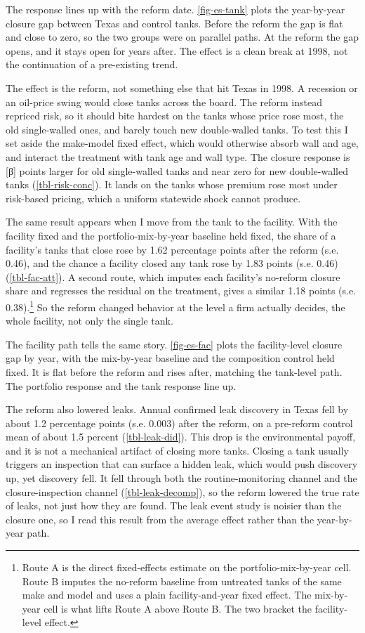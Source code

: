 \documentclass[
  12pt,
]{article}
\begin{document}
The response lines up with the reform date. \autoref{fig-es-tank} plots
the year-by-year closure gap between Texas and control tanks. Before the
reform the gap is flat and close to zero, so the two groups were on
parallel paths. At the reform the gap opens, and it stays open for years
after. The effect is a clean break at 1998, not the continuation of a
pre-existing trend.

The effect is the reform, not something else that hit Texas in 1998. A
recession or an oil-price swing would close tanks across the board. The
reform instead repriced risk, so it should bite hardest on the tanks
whose price rose most, the old single-walled ones, and barely touch new
double-walled tanks. To test this I set aside the make-model fixed
effect, which would otherwise absorb wall and age, and interact the
treatment with tank age and wall type. The closure response is {[}β{]}
points larger for old single-walled tanks and near zero for new
double-walled tanks (\autoref{tbl-risk-conc}). It lands on the tanks
whose premium rose most under risk-based pricing, which a uniform
statewide shock cannot produce.

The same result appears when I move from the tank to the facility. With
the facility fixed and the portfolio-mix-by-year baseline held fixed,
the share of a facility's tanks that close rose by 1.62 percentage
points after the reform (s.e. 0.46), and the chance a facility closed
any tank rose by 1.83 points (s.e. 0.46) (\autoref{tbl-fac-att}). A
second route, which imputes each facility's no-reform closure share and
regresses the residual on the treatment, gives a similar 1.18 points
(s.e. 0.38).\footnote{Route A is the direct fixed-effects estimate on
  the portfolio-mix-by-year cell. Route B imputes the no-reform baseline
  from untreated tanks of the same make and model and uses a plain
  facility-and-year fixed effect. The mix-by-year cell is what lifts
  Route A above Route B. The two bracket the facility-level effect.} So
the reform changed behavior at the level a firm actually decides, the
whole facility, not only the single tank.

The facility path tells the same story. \autoref{fig-es-fac} plots the
facility-level closure gap by year, with the mix-by-year baseline and
the composition control held fixed. It is flat before the reform and
rises after, matching the tank-level path. The portfolio response and
the tank response line up.

The reform also lowered leaks. Annual confirmed leak discovery in Texas
fell by about 1.2 percentage points (s.e. 0.003) after the reform, on a
pre-reform control mean of about 1.5 percent (\autoref{tbl-leak-did}).
This drop is the environmental payoff, and it is not a mechanical
artifact of closing more tanks. Closing a tank usually triggers an
inspection that can surface a hidden leak, which would push discovery
up, yet discovery fell. It fell through both the routine-monitoring
channel and the closure-inspection channel (\autoref{tbl-leak-decomp}),
so the reform lowered the true rate of leaks, not just how they are
found. The leak event study is noisier than the closure one, so I read
this result from the average effect rather than the year-by-year path.
\end{document}
